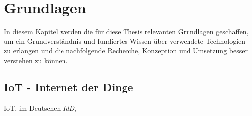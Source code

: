 \chapter{Grundlagen}
\label{chap:grundlagen}
    In diesem Kapitel werden die für diese Thesis relevanten Grundlagen geschaffen, um ein Grundverständnis und 
    fundiertes Wissen über verwendete Technologien zu erlangen und die nachfolgende Recherche, Konzeption und 
    Umsetzung besser verstehen zu können. 

\section{IoT - Internet der Dinge}
\label{sec:iot}

    \ac{IoT}, im Deutschen \textit{\ac{IdD}},  

